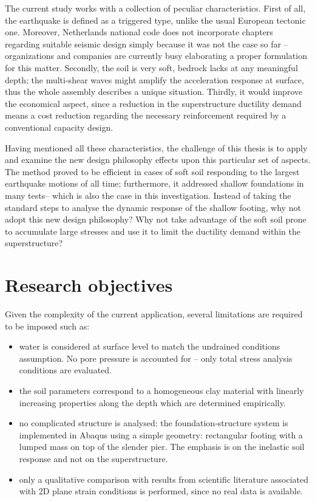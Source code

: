 \documentclass[12pt,a4paper]{report}
\begin{document}
The current study works with a collection of peculiar characteristics. First of all, the earthquake is defined as a triggered type, unlike the usual European tectonic one. Moreover, Netherlands national code does not incorporate chapters regarding suitable seismic design simply because it was not the case so far – organizations and companies are currently busy elaborating a proper formulation for this matter. Secondly, the soil is very soft, bedrock lacks at any meaningful depth; the multi-shear waves might amplify the acceleration response at surface, thus the whole assembly describes a unique situation. Thirdly, it would improve the economical aspect, since a reduction in the superstructure ductility demand means a cost reduction regarding the necessary reinforcement required by a conventional capacity design.

Having mentioned all these characteristics, the challenge of this thesis is to apply and examine the new design philosophy effects upon this particular set of aspects. The method proved to be efficient in cases of soft soil responding to the largest earthquake motions of all time; furthermore, it addressed shallow foundations in many tests– which is also the case in this investigation. Instead of taking the standard steps to analyse the dynamic response of the shallow footing, why not adopt this new design philosophy? Why not take advantage of the soft soil prone to accumulate large stresses and use it to limit the ductility demand within the superstructure? 


\section{Research objectives}
Given the complexity of the current application, several limitations are required to be imposed such as:
\begin{itemize}
	\item water is considered at surface level to match the undrained conditions assumption. No pore pressure is accounted for – only total stress analysis conditions are evaluated.
	\item the soil parameters correspond to a homogeneous clay material with linearly increasing properties along the depth which are determined empirically.
	\item no complicated structure is analysed: the foundation-structure system is implemented in Abaqus using a simple geometry: rectangular footing with a lumped mass on top of the slender pier. The emphasis is on the inelastic soil response and not on the superstructure.
	\item only a qualitative comparison with results from scientific literature associated with 2D plane strain conditions is performed, since no real data is available.
\end{itemize}
\end{document}
